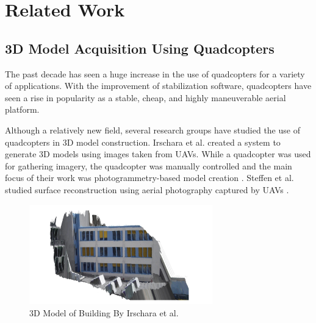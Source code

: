 
\chapter{Related Work\label{ch:pastwork}}

\section{3D Model Acquisition Using Quadcopters}

	The past decade has seen a huge increase in the use of quadcopters for a variety of applications. With the improvement of stabilization software, quadcopters have seen a rise in popularity as a stable, cheap, and highly maneuverable aerial platform. 

	Although a relatively new field, several research groups have studied the use of quadcopters in 3D model construction. Irschara et al. created a system to generate 3D models using images taken from UAVs. While a quadcopter was used for gathering imagery, the quadcopter was manually controlled and the main focus of their work was photogrammetry-based model creation \cite{Irschara}. Steffen et al. studied surface reconstruction using aerial photography captured by UAVs \cite{Steffen}.

	 \begin{figure}[ht]
            \centering
            \includegraphics[width=300px]{../images/Irschara.png}
            \caption{3D Model of Building By Irschara et al.~\cite{Irschara}}\label{fig:Irschara}
    \end{figure}


